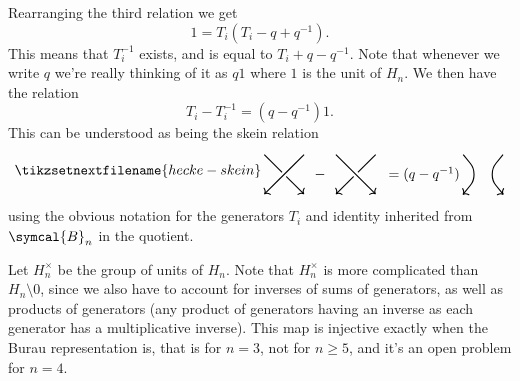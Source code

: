 \documentclass[fleqn]{NotesClass}
\newcommand{\braid}{\symcal{B}}
\begin{document}
    Rearranging the third relation we get
    \begin{equation}
        1 = T_i(T_i - q + q^{-1}).
    \end{equation}
    This means that \(T_i^{-1}\) exists, and is equal to \(T_i + q - q^{-1}\).
    Note that whenever we write \(q\) we're really thinking of it as \(q1\) where \(1\) is the unit of \(H_n\).
    We then have the relation
    \begin{equation}
        T_i - T_i^{-1} = (q - q^{-1}) 1.
    \end{equation}
    This can be understood as being the skein relation
    \begin{equation}
        \tikzsetnextfilename{hecke-skein}
        \begin{tikzpicture}[baseline=(current bounding box)]
            \draw [thick, ->] (0, 1) -- (1, 0);
            \draw [line width=1.5mm, white] (1, 1) -- (0, 0);
            \draw [thick, ->] (1, 1) -- (0, 0);
            \node at (1.4, 0.5) {\(-\)};
            \begin{scope}[xshift=1.8cm]
                \draw [thick, ->] (1, 1) -- (0, 0);
                \draw [line width=1.5mm, white] (0, 1) -- (1, 0);
                \draw [thick, ->] (0, 1) -- (1, 0);
                \node [right] at (1.1, 0.5) {\({}= (q - q^{-1})\)};
            \end{scope}
            \begin{scope}[xshift=5cm]
                \draw [thick, rounded corners=10] (0, 1) -- (0.4, 0.5) -- (0, 0);
                \draw [thick, rounded corners=10] (1, 1) -- (0.6, 0.5) -- (1, 0);
                \draw [thick, ->] (0, 0) -- ++ (-0.01, -0.01);
                \draw [thick, ->] (1, 0) -- ++ (0.01, -0.01);
            \end{scope}
        \end{tikzpicture}
    \end{equation}
    using the obvious notation for the generators \(T_i\) and identity inherited from \(\braid_n\) in the quotient.
    
    Let \(H_n^{\times}\) be the group of units of \(H_n\).
    Note that \(H_n^{\times}\) is more complicated than \(H_n \setminus 0\), since we also have to account for inverses of sums of generators, as well as products of generators (any product of generators having an inverse as each generator has a multiplicative inverse).
    This map is injective exactly when the Burau representation is, that is for \(n = 3\), not for \(n \ge 5\), and it's an open problem for \(n = 4\).
    
\end{document}
